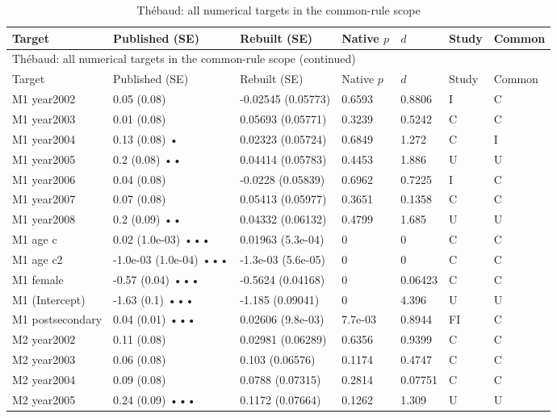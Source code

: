 {\scriptsize\setlength{\tabcolsep}{3pt}\renewcommand{\arraystretch}{1.06}
\begin{longtable}{@{}p{.245\linewidth}p{.17\linewidth}p{.17\linewidth}p{.085\linewidth}p{.060\linewidth}p{.08\linewidth}p{.07\linewidth}@{}}
\caption{Thébaud: all numerical targets in the common-rule scope}\label{tab:all:thebaud2015}\\
\toprule Target & Published (SE) & Rebuilt (SE) & Native $p$ & $d$ & Study & Common\\\midrule
\endfirsthead\multicolumn{7}{l}{\small Thébaud: all numerical targets in the common-rule scope (continued)}\\\toprule Target & Published (SE) & Rebuilt (SE) & Native $p$ & $d$ & Study & Common\\\midrule\endhead\bottomrule\endfoot
M1 year2002 & 0.05 (0.08) & -0.02545 (0.05773) & 0.6593 & 0.8806 & I & C\\
M1 year2003 & 0.01 (0.08) & 0.05693 (0.05771) & 0.3239 & 0.5242 & C & C\\
M1 year2004 & 0.13 (0.08) • & 0.02323 (0.05724) & 0.6849 & 1.272 & C & I\\
M1 year2005 & 0.2 (0.08) •• & 0.04414 (0.05783) & 0.4453 & 1.886 & U & U\\
M1 year2006 & 0.04 (0.08) & -0.0228 (0.05839) & 0.6962 & 0.7225 & I & C\\
M1 year2007 & 0.07 (0.08) & 0.05413 (0.05977) & 0.3651 & 0.1358 & C & C\\
M1 year2008 & 0.2 (0.09) •• & 0.04332 (0.06132) & 0.4799 & 1.685 & U & U\\
M1 age c & 0.02 (1.0e-03) ••• & 0.01963 (5.3e-04) & 0 & 0 & C & C\\
M1 age c2 & -1.0e-03 (1.0e-04) ••• & -1.3e-03 (5.6e-05) & 0 & 0 & C & C\\
M1 female & -0.57 (0.04) ••• & -0.5624 (0.04168) & 0 & 0.06423 & C & C\\
M1 (Intercept) & -1.63 (0.1) ••• & -1.185 (0.09041) & 0 & 4.396 & U & U\\
M1 postsecondary & 0.04 (0.01) ••• & 0.02606 (9.8e-03) & 7.7e-03 & 0.8944 & FI & C\\
M2 year2002 & 0.11 (0.08) & 0.02981 (0.06289) & 0.6356 & 0.9399 & C & C\\
M2 year2003 & 0.06 (0.08) & 0.103 (0.06576) & 0.1174 & 0.4747 & C & C\\
M2 year2004 & 0.09 (0.08) & 0.0788 (0.07315) & 0.2814 & 0.07751 & C & C\\
M2 year2005 & 0.24 (0.09) ••• & 0.1172 (0.07664) & 0.1262 & 1.309 & U & U\\

\end{longtable}}
